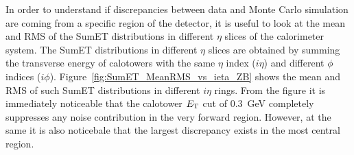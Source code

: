 In order to understand if discrepancies between data and Monte Carlo simulation are coming from a specific region of the detector, it is useful to
look at the mean and RMS of the SumET distributions in different $\eta$ slices of the calorimeter system. The SumET distributions in different $\eta$ slices are obtained
by summing the transverse energy of calotowers with the same $\eta$ index ($i\eta$) and different $\phi$ indices ($i\phi$).
Figure~\ref{fig:SumET_MeanRMS_vs_ieta_ZB} shows the mean and RMS of such SumET distributions in different $i\eta$ rings. From the figure it is
immediately noticeable that the calotower $E_{\rm T}$ cut of $0.3$~GeV completely suppresses any noise contribution in the very forward region.
However, at the same it is also noticebale that the largest discrepancy exists in the most central region.


